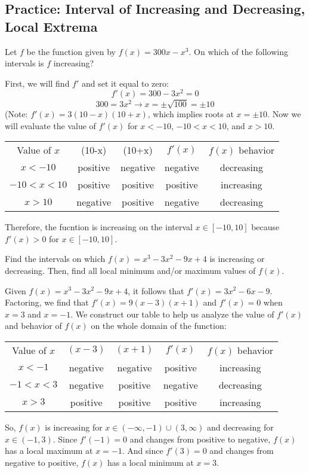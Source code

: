 \subsection{Practice: Interval of Increasing and Decreasing, Local Extrema}
\begin{Exercise}
    [label=incdec1]
    Let $f$ be the function given by $f(x) = 300x-x^3$. On which of the following intervals is $f$ increasing?
\end{Exercise}

\begin{Answer}
    [ref=incdec1]
    First, we will find $f'$ and set it equal to zero: $$f'(x)=300-3x^2=0$$ $$300=3x^2 \rightarrow x=\pm \sqrt{100} = \pm10$$ (Note: $f'(x) = 3(10-x)(10+x)$, which implies roots at $x=\pm10$. Now we will evaluate the value of $f'(x)$ for $x<-10$, $-10<x<10$, and $x>10$. 
    \begin{center}
        \begin{tabular}{c|c|c|c|c}
        Value of $x$ & (10-x) & (10+x) & $f'(x)$ & $f(x)$ behavior\\
         $x<-10$    &  positive & negative& negative & decreasing\\
         $-10<x<10$    & positive & positive& positive& increasing\\
         $x>10$ & negative & positive & negative & decreasing
        \end{tabular}
    \end{center}
    Therefore, the fucntion is increasing on the interval $x \in [-10, 10]$ because $f'(x) >0$ for $x \in [-10, 10]$.
\end{Answer}

\begin{Exercise}[label=locext1]
Find the intervals on which $f(x)=x^3-3x^2-9x+4$ is increasing or decreasing. Then, find all local minimum and/or maximum values of $f(x)$. 
\end{Exercise}

\begin{Answer}[ref=locext1]
Given $f(x)=x^3-3x^2-9x+4$, it follows that $f'(x)=3x^2-6x-9$. Factoring, we find that $f'(x) = 9(x-3)(x+1)$ and $f'(x) = 0$ when $x=3$ and $x=-1$. We construct our table to help us analyze the value of $f'(x)$ and behavior of $f(x)$ on the whole domain of the function:
\begin{center}
	\begin{tabular}{c|c|c|c|c}
		Value of $x$ & $(x-3)$ & $(x+1)$ & $f'(x)$ & $f(x)$ behavior\\
		$x<-1$ & negative & negative & positive & increasing\\
		$-1<x<3$ & negative & positive & negative & decreasing\\
		$x>3$ & positive & positive & positive & increasing
	\end{tabular}
\end{center}
So, $f(x)$ is increasing for $x \in (-\infty, -1) \cup (3, \infty)$ and decreasing for $x \in (-1, 3)$. Since $f'(-1)=0$ and changes from positive to negative, $f(x)$ has a local maximum at $x=-1$. And since $f'(3)=0$ and changes from negative to positive, $f(x)$ has a local minimum at $x=3$.
\end{Answer}



